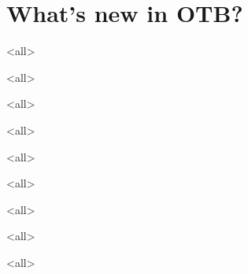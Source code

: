 \section{What's new in OTB?}

\mode<all>


\mode<all>


\mode<all>


\mode<all>


\mode<all>


\mode<all>


\mode<all>


\mode<all>


\mode<all>
















